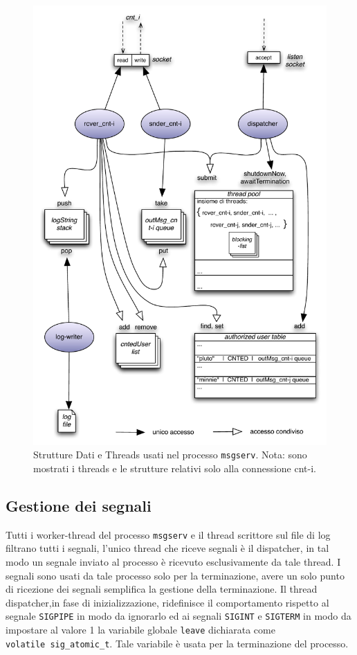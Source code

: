 \documentclass[a4paper,10pt]{article}
\begin{document}
\begin{figure}[htp]
  \centering
  \includegraphics[scale = 0.6]{serverObjects.pdf}
  \caption{Strutture Dati e Threads usati nel processo
    \texttt{msgserv}. Nota: sono mostrati i threads e le strutture
    relativi solo alla connessione cnt-i.}
\end{figure}

\subsection{Gestione dei segnali}
Tutti i worker-thread del processo \texttt{msgserv} e il thread
scrittore sul file di log filtrano tutti i segnali, l'unico thread che
riceve segnali \`e il dispatcher, in tal modo un segnale inviato al
processo \`e ricevuto esclusivamente da tale thread. I segnali sono
usati da tale processo solo per la terminazione, avere un solo punto
di ricezione dei segnali semplifica la gestione della terminazione. Il
thread dispatcher,in fase di inizializzazione, ridefinisce il
comportamento rispetto al segnale \texttt{SIGPIPE} in modo da
ignorarlo ed ai segnali \texttt{SIGINT} e \texttt{SIGTERM} in modo da
impostare al valore 1 la variabile globale \texttt{leave} dichiarata
come \texttt{volatile~sig\-\_atomic\_t}. Tale variabile \`e usata per la
terminazione del processo.
\end{document}
